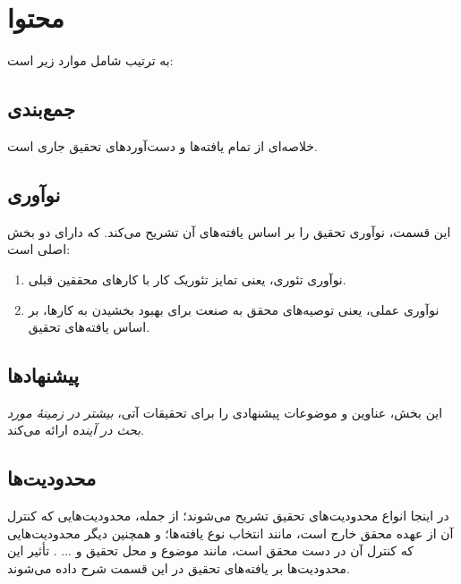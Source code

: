 \section{محتوا}
به ترتیب شامل موارد زیر است:

\subsection{جمع‌بندی}
خلاصه‌ای از تمام یافته‌ها و دست‌آوردهای تحقیق جاری است.

\subsection{نوآوری}
این قسمت، نوآوری تحقیق را بر اساس یافته‌های آن تشریح می‌کند. که دارای دو بخش اصلی است:
\begin{enumerate}
	\item
	نوآوری تئوری، یعنی تمایز تئوریک کار با کارهای محققین قبلی.
	\item
	نوآوری عملی، یعنی توصیه‌های محقق به صنعت برای بهبود بخشیدن به کارها، بر اساس یافته‌های تحقیق.
\end{enumerate}

\subsection{پیشنهادها}
این بخش، عناوین و موضوعات پیشنهادی را برای تحقیقات آتی،
\emph{بیشتر در زمينهٔ مورد بحث در آينده}
ارائه می‌کند.

\subsection{محدودیت‌ها}
در اینجا انواع محدودیت‌های تحقیق تشریح می‌شوند؛ از جمله، محدودیت‌هایی که کنترل آن از عهده محقق خارج است، مانند انتخاب نوع یافته‌ها؛ و همچنین دیگر محدودیت‌هایی که کنترل آن در دست محقق است، مانند موضوع و محل تحقیق و ... . تأثیر این محدودیت‌ها بر یافته‌های تحقیق در این قسمت شرح داده می‌شوند.